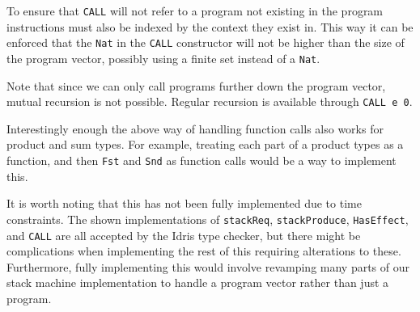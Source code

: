 To ensure that \texttt{CALL} will not refer to a program not existing in the program instructions must also be indexed by the context they exist in. This way it can be enforced that the \texttt{Nat} in the \texttt{CALL} constructor will not be higher than the size of the program vector, possibly using a finite set instead of a \texttt{Nat}.

Note that since we can only call programs further down the program vector, mutual recursion is not possible. Regular recursion is available through \texttt{CALL~e~0}.

Interestingly enough the above way of handling function calls also works for product and sum types. For example, treating each part of a product types as a function, and then \texttt{Fst} and \texttt{Snd} as function calls would be a way to implement this.

It is worth noting that this has not been fully implemented due to time constraints. The shown implementations of \texttt{stackReq}, \texttt{stackProduce}, \texttt{HasEffect}, and \texttt{CALL} are all accepted by the Idris type checker, but there might be complications when implementing the rest of this requiring alterations to these. Furthermore, fully implementing this would involve revamping many parts of our stack machine implementation to handle a program vector rather than just a program.